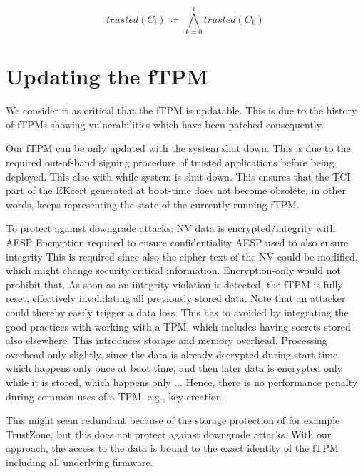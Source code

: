 \begin{equation}
trusted(C_{i}) \, \coloneqq \, \bigwedge_{k=0}^{i} trusted(C_{k})
\end{equation}

\section{Updating the fTPM}

We consider it as critical that the \ac{fTPM} is updatable. This is due to the history of \acp{fTPM} showing vulnerabilities which have been patched consequently. %

Our \ac{fTPM} can be only updated with the system shut down. This is due to the required out-of-band signing procedure of trusted applications before being deployed. This also  with while system is shut down. This ensures that the TCI part of the EKcert generated at boot-time does not become obsolete, in other words, keeps representing the state of the currently running fTPM.


To protect against downgrade attacks:
NV data is encrypted/integrity with AESP
Encryption required to ensure confidentiality
AESP used to also ensure integrity
This is required since also the cipher text of the NV could be modified, which might change security critical information.
Encryption-only would not prohibit that.
As soon as an integrity violation is detected, the \ac{fTPM} is fully reset, effectively invalidating all previously stored data.
Note that an attacker could thereby easily trigger a data loss.
This has to avoided by integrating the good-practices with working with a \ac{TPM}, which includes having secrets stored also elsewhere. %
This introduces storage and memory overhead.
Processing overhead only slightly, since the data is already decrypted during start-time, which happens only once at boot time, and then later data is encrypted only while it is stored, which happens only ... %
Hence, there is no performance penalty during common uses of a \ac{TPM}, e.g., key creation.

This might seem redundant because of the storage protection of for example TrustZone, but this does not protect against downgrade attacks. With our approach, the access to the data is bound to the exact identity of the fTPM including all underlying firmware.

